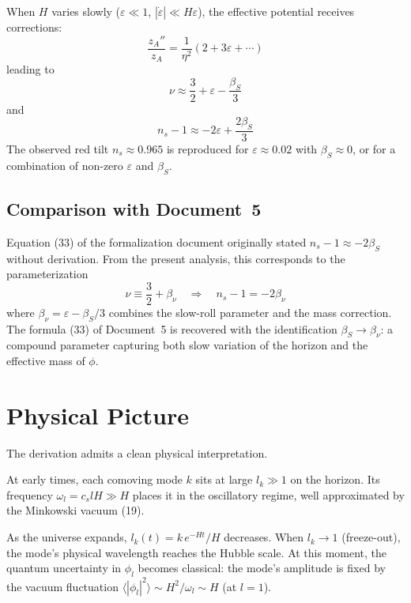 \documentclass[12pt,a4paper]{article}
\begin{document}
When $H$ varies slowly ($\varepsilon \ll 1$, $|\dot{\varepsilon}| \ll H\varepsilon$), the effective potential receives corrections:
\begin{equation}
\frac{z_A''}{z_A} = \frac{1}{\eta^2}\left(2 + 3\varepsilon + \cdots\right) \tag{31}
\end{equation}
leading to
\begin{equation}
\nu \approx \frac{3}{2} + \varepsilon - \frac{\beta_S}{3} \tag{32}
\end{equation}
and
\begin{equation}
n_s - 1 \approx -2\varepsilon + \frac{2\beta_S}{3} \tag{33}
\end{equation}
The observed red tilt $n_s \approx 0.965$ is reproduced for $\varepsilon \approx 0.02$ with $\beta_S \approx 0$, or for a combination of non-zero $\varepsilon$ and $\beta_S$.

\subsection{Comparison with Document~5}

Equation (33) of the formalization document originally stated $n_s - 1 \approx -2\beta_S$ without derivation. From the present analysis, this corresponds to the parameterization
\begin{equation}
\nu \equiv \frac{3}{2} + \beta_\nu \quad \Longrightarrow \quad n_s - 1 = -2\beta_\nu \tag{34}
\end{equation}
where $\beta_\nu = \varepsilon - \beta_S/3$ combines the slow-roll parameter and the mass correction. The formula (33) of Document~5 is recovered with the identification $\beta_S \to \beta_\nu$: a compound parameter capturing both slow variation of the horizon and the effective mass of $\phi$.

\section{Physical Picture}

The derivation admits a clean physical interpretation.

At early times, each comoving mode $k$ sits at large $l_k \gg 1$ on the horizon. Its frequency $\omega_l = c_s l H \gg H$ places it in the oscillatory regime, well approximated by the Minkowski vacuum (19).

As the universe expands, $l_k(t) = k\,e^{-Ht}/H$ decreases. When $l_k \to 1$ (freeze-out), the mode's physical wavelength reaches the Hubble scale. At this moment, the quantum uncertainty in $\phi_l$ becomes classical: the mode's amplitude is fixed by the vacuum fluctuation $\langle|\phi_l|^2\rangle \sim H^2 / \omega_l \sim H$ (at $l = 1$).
\end{document}
